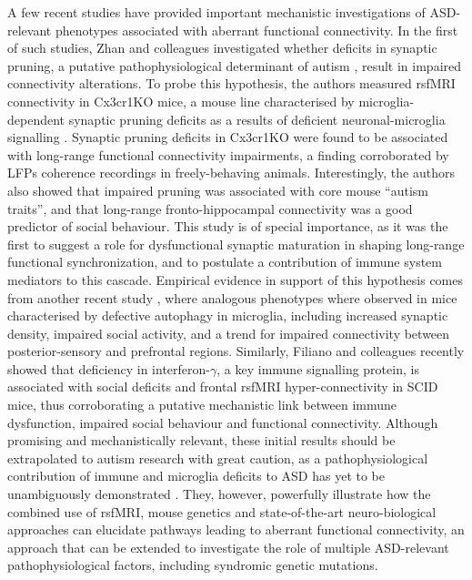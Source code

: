 A few recent studies have provided important mechanistic investigations of
ASD-relevant phenotypes associated with aberrant functional connectivity. In the
first of such studies, Zhan and colleagues \parencite{zhan2014} investigated
whether deficits in synaptic pruning, a putative pathophysiological determinant
of autism \parencite{hutsler2010}, result in impaired connectivity alterations.
To probe this hypothesis, the authors measured rsfMRI connectivity in Cx3cr1KO
mice, a mouse line characterised by microglia-dependent synaptic pruning
deficits as a results of deficient neuronal-microglia signalling
\parencite{paolicelli2011}. Synaptic pruning deficits in Cx3cr1KO were found to
be associated with long-range functional connectivity impairments, a finding
corroborated by LFPs coherence recordings in freely-behaving animals.
Interestingly, the authors also showed that impaired pruning was associated with
core mouse “autism traits”, and that long-range fronto-hippocampal connectivity
was a good predictor of social behaviour. This study is of special importance,
as it was the first to suggest a role for dysfunctional synaptic maturation in
shaping long-range functional synchronization, and to postulate a contribution
of immune system mediators to this cascade. Empirical evidence in support of
this hypothesis comes from another recent study \parencite{kim2016}, where
analogous phenotypes where observed in mice characterised by defective autophagy
in microglia, including increased synaptic density, impaired social activity,
and a trend for impaired connectivity between posterior-sensory and prefrontal
regions. Similarly, Filiano and colleagues \parencite{filiano2016} recently
showed that deficiency in interferon-$\gamma$, a key immune signalling protein, is
associated with social deficits and frontal rsfMRI hyper-connectivity in SCID
mice, thus corroborating a putative mechanistic link between immune dysfunction,
impaired social behaviour and functional connectivity. Although promising and
mechanistically relevant, these initial results should be extrapolated to autism
research with great caution, as a pathophysiological contribution of immune and
microglia deficits to ASD has yet to be unambiguously demonstrated
\parencite{estes2015}. They, however, powerfully illustrate how the combined use
of rsfMRI, mouse genetics and state-of-the-art neuro-biological approaches can
elucidate pathways leading to aberrant functional connectivity, an approach that
can be extended to investigate the role of multiple ASD-relevant
pathophysiological factors, including syndromic genetic mutations.

